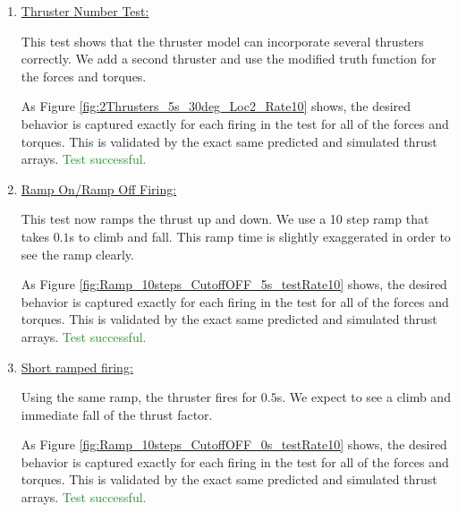 \begin{enumerate}
   \item{\underline{Thruster Number Test:} }
   
         

 This test shows that the thruster model can incorporate several thrusters correctly. We add a second thruster and use the modified truth function for the forces and torques.
      
    
    
    As Figure \ref{fig:2Thrusters_5s_30deg_Loc2_Rate10} shows, the desired behavior is captured exactly for each 
    firing in the test for all of the forces and torques. This is validated by the exact same predicted and simulated thrust arrays.  \textcolor{ForestGreen}{Test successful.}
   
\item{\underline{Ramp On/Ramp Off Firing:} }

         

 This test now ramps the thrust up and down. We use a 10 step ramp that takes $0.1$s to climb and fall. This ramp time is slightly exaggerated in order to see the ramp clearly.      
    
    
    As Figure \ref{fig:Ramp_10steps_CutoffOFF_5s_testRate10} shows, the desired behavior is captured exactly for each 
    firing in the test for all of the forces and torques. This is validated by the exact same predicted and simulated thrust arrays. \textcolor{ForestGreen}{Test successful.}
   

  \item{\underline{Short ramped firing:} }
  
    

Using the same ramp, the thruster fires for $0.5$s. We expect to see a climb and immediate fall of the thrust factor.
       
    
    
    As Figure \ref{fig:Ramp_10steps_CutoffOFF_0s_testRate10} shows, the desired behavior is captured exactly for each 
    firing in the test for all of the forces and torques. This is validated by the exact same predicted and simulated thrust arrays. \textcolor{ForestGreen}{Test successful.}
  

\end{enumerate}
